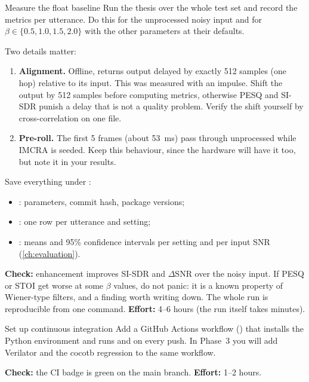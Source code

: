 \begin{stepbox}[label=st:setup:baseline]{Measure the float baseline}
Run the thesis  over the whole test set and record the
metrics per utterance. Do this for the unprocessed noisy input and for
$\beta\in\{0.5, 1.0, 1.5, 2.0\}$ with the other parameters at their defaults.

Two details matter:
\begin{enumerate}
  \item \textbf{Alignment.} Offline,  returns output
  delayed by exactly 512 samples (one hop) relative to its input. This was
  measured with an impulse. Shift the output by 512 samples before computing
  metrics, otherwise PESQ and SI-SDR punish a delay that is not a quality
  problem. Verify the shift yourself by cross-correlation on one file.
  \item \textbf{Pre-roll.} The first 5 frames (about \qty{53}{\ms}) pass through
  unprocessed while IMCRA is seeded. Keep this behaviour, since the hardware
  will have it too, but note it in your results.
\end{enumerate}

Save everything under :
\begin{itemize}
  \item {}: parameters, commit hash, package versions;
  \item {}: one row per utterance and setting;
  \item {}: means and 95\% confidence intervals per setting and
        per input SNR (\cref{ch:evaluation}).
\end{itemize}

\textbf{Check:} enhancement improves SI-SDR and $\Delta$SNR over the noisy
input. If PESQ or STOI get worse at some $\beta$ values, do not panic: it is
a known property of Wiener-type filters, and a finding worth writing down. The
whole run is reproducible from one command. \textbf{Effort:} 4--6 hours
(the run itself takes minutes).
\end{stepbox}

\begin{stepbox}[label=st:setup:ci]{Set up continuous integration}
Add a GitHub Actions workflow () that installs
the Python environment and runs  and  on every push.
In Phase~3 you will add Verilator and the cocotb regression to the same
workflow.

\textbf{Check:} the CI badge is green on the main branch.
\textbf{Effort:} 1--2 hours.
\end{stepbox}


